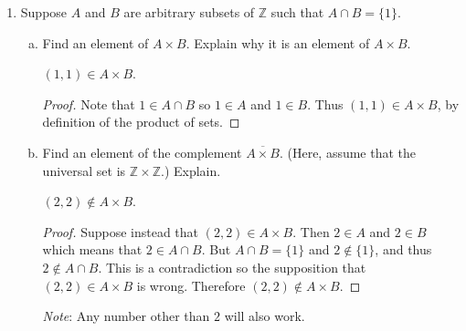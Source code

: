 \documentclass[11pt]{article}
\newcommand{\ZZ}{\mathbb{Z}}
\begin{document}
\begin{enumerate}
\item Suppose $A$ and $B$ are arbitrary subsets of $\ZZ$ such that $A\cap B=\{1\}$.
      \begin{enumerate}[(a)]
             \item Find an element of $A\times B$. Explain why it is an element of $A\times B$.\begin{Solution} $(1,1)\in A\times B$.
             \begin{proof}
             Note that $1\in A\cap B$ so $1\in A$ and $1\in B$. Thus $(1,1)\in A\times B$, by definition of the product of sets.
              \end{proof}
              \end{Solution}
             \item Find an element of the complement $\overline{A\times B}$. (Here, assume that the universal set is $\ZZ\times\ZZ$.) Explain.\begin{Solution} $(2,2)\not\in A\times B$.
             \begin{proof}
                Suppose instead that $(2,2)\in A\times B$. Then $2\in A$ and $2\in B$ which means that $2\in A\cap B$. But $A\cap B = \{1\}$ and $2\not\in \{1\}$, and thus $2\not\in A\cap B$. This is a contradiction so the supposition that $(2,2)\in A\times B$ is wrong. Therefore $(2,2)\not\in A\times B$.
              \end{proof}
              \emph{Note}: Any number other than $2$ will also work.
              \end{Solution}
      \end{enumerate}
\end{enumerate}
\end{document}
